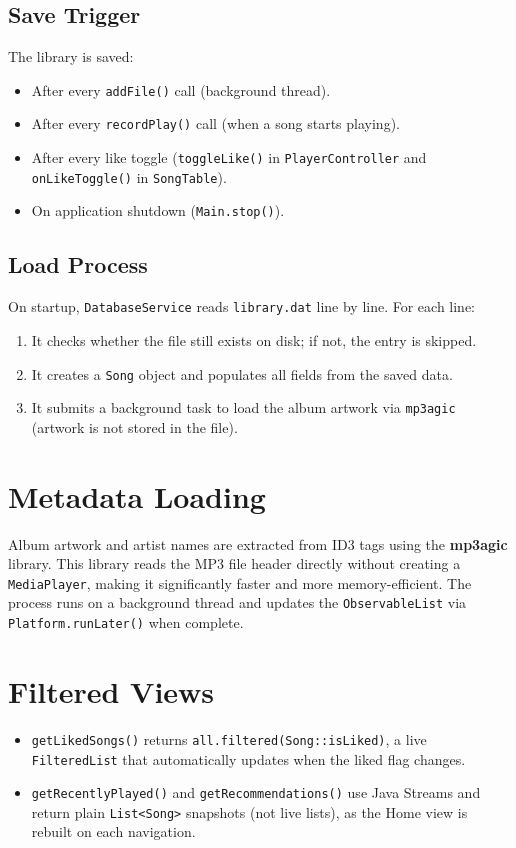 ﻿\documentclass[12pt]{report}
\begin{document}
\subsection{Save Trigger}
The library is saved:
\begin{itemize}
    \item After every \texttt{addFile()} call (background thread).
    \item After every \texttt{recordPlay()} call (when a song starts playing).
    \item After every like toggle (\texttt{toggleLike()} in \texttt{PlayerController} and \texttt{onLikeToggle()} in \texttt{SongTable}).
    \item On application shutdown (\texttt{Main.stop()}).
\end{itemize}

\subsection{Load Process}
On startup, \texttt{DatabaseService} reads \texttt{library.dat} line by line. For each line:
\begin{enumerate}
    \item It checks whether the file still exists on disk; if not, the entry is skipped.
    \item It creates a \texttt{Song} object and populates all fields from the saved data.
    \item It submits a background task to load the album artwork via \texttt{mp3agic} (artwork is not stored in the file).
\end{enumerate}

\section{Metadata Loading}
Album artwork and artist names are extracted from ID3 tags using the \textbf{mp3agic} library. This library reads the MP3 file header directly without creating a \texttt{MediaPlayer}, making it significantly faster and more memory-efficient. The process runs on a background thread and updates the \texttt{ObservableList} via \texttt{Platform.runLater()} when complete.

\section{Filtered Views}
\begin{itemize}
    \item \texttt{getLikedSongs()} returns \texttt{all.filtered(Song::isLiked)}, a live \texttt{FilteredList} that automatically updates when the liked flag changes.
    \item \texttt{getRecentlyPlayed()} and \texttt{getRecommendations()} use Java Streams and return plain \texttt{List<Song>} snapshots (not live lists), as the Home view is rebuilt on each navigation.
\end{itemize}
\end{document}
